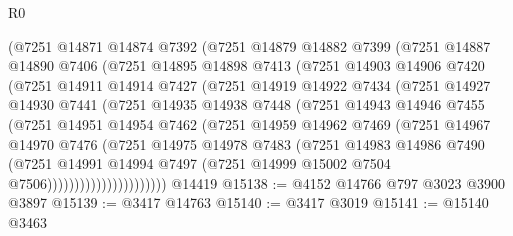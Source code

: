 \begin{lexlean}{R0}
\begin{coremodule}
              (@7251
                @14871
                @14874
                @7392
                (@7251
                  @14879
                  @14882
                  @7399
                  (@7251
                    @14887
                    @14890
                    @7406
                    (@7251
                      @14895
                      @14898
                      @7413
                      (@7251
                        @14903
                        @14906
                        @7420
                        (@7251
                          @14911
                          @14914
                          @7427
                          (@7251
                            @14919
                            @14922
                            @7434
                            (@7251
                              @14927
                              @14930
                              @7441
                              (@7251
                                @14935
                                @14938
                                @7448
                                (@7251
                                  @14943
                                  @14946
                                  @7455
                                  (@7251
                                    @14951
                                    @14954
                                    @7462
                                    (@7251
                                      @14959
                                      @14962
                                      @7469
                                      (@7251
                                        @14967
                                        @14970
                                        @7476
                                        (@7251
                                          @14975
                                          @14978
                                          @7483
                                          (@7251
                                            @14983
                                            @14986
                                            @7490
                                            (@7251
                                              @14991
                                              @14994
                                              @7497
                                              (@7251 @14999 @15002 @7504 @7506))))))))))))))))))))))
    @14419
@15138 := @4152 @14766 @797 @3023 @3900 @3897
@15139 := @3417 @14763
@15140 := @3417 @3019
@15141 := @15140 @3463

\end{coremodule}
\end{lexlean}
